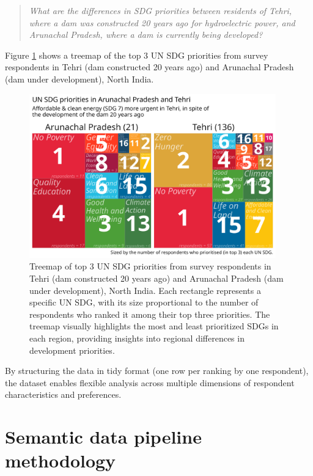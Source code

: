 \documentclass{article}
\begin{document}
\begin{quote}
  \textit{What are the differences in SDG priorities between residents of Tehri, where a dam was constructed 20 years ago for hydroelectric power, and Arunachal Pradesh, where a dam is currently being developed?}
\end{quote}

Figure \ref{fig:top3-treemap} shows a treemap of the top 3 UN SDG priorities from survey respondents in Tehri (dam constructed 20 years ago) and Arunachal Pradesh (dam under development), North India.

\begin{figure}[ht]
  \centering
  \includegraphics[width=0.95\textwidth]{../figures_and_tables/top3-treemap.png}
  \caption{\label{fig:top3-treemap} Treemap of top 3 UN SDG priorities from survey respondents in Tehri (dam constructed 20 years ago) and Arunachal Pradesh (dam under development), North India. Each rectangle represents a specific UN SDG, with its size proportional to the number of respondents who ranked it among their top three priorities. The treemap visually highlights the most and least prioritized SDGs in each region, providing insights into regional differences in development priorities.}
\end{figure}

By structuring the data in tidy format (one row per ranking by one respondent), the dataset enables flexible analysis across multiple dimensions of respondent characteristics and preferences. 

\section{Semantic data pipeline methodology}
\label{sec:semantic-methodology}
\end{document}

